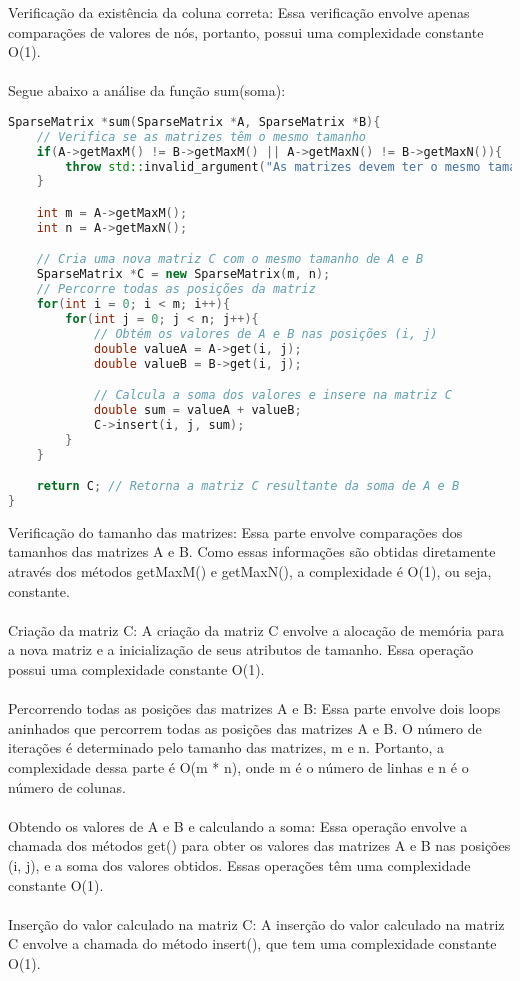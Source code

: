 \documentclass[a4paper,12pt]{article}
\begin{document}
Verificação da existência da coluna correta: Essa verificação envolve apenas comparações de valores de nós, portanto, possui uma complexidade constante O(1).
\\\\
Segue abaixo a análise da função sum(soma):
\begin{lstlisting}[language=C++]
SparseMatrix *sum(SparseMatrix *A, SparseMatrix *B){
    // Verifica se as matrizes têm o mesmo tamanho
    if(A->getMaxM() != B->getMaxM() || A->getMaxN() != B->getMaxN()){
        throw std::invalid_argument("As matrizes devem ter o mesmo tamanho para serem somadas.");
    }

    int m = A->getMaxM();
    int n = A->getMaxN();

    // Cria uma nova matriz C com o mesmo tamanho de A e B
    SparseMatrix *C = new SparseMatrix(m, n);
    // Percorre todas as posições da matriz
    for(int i = 0; i < m; i++){
        for(int j = 0; j < n; j++){
            // Obtém os valores de A e B nas posições (i, j)
            double valueA = A->get(i, j);
            double valueB = B->get(i, j);

            // Calcula a soma dos valores e insere na matriz C
            double sum = valueA + valueB;
            C->insert(i, j, sum);
        }
    }

    return C; // Retorna a matriz C resultante da soma de A e B
}
\end{lstlisting}
Verificação do tamanho das matrizes: Essa parte envolve comparações dos tamanhos das matrizes A e B. Como essas informações são obtidas diretamente através dos métodos getMaxM() e getMaxN(), a complexidade é O(1), ou seja, constante.
\\\\
Criação da matriz C: A criação da matriz C envolve a alocação de memória para a nova matriz e a inicialização de seus atributos de tamanho. Essa operação possui uma complexidade constante O(1).
\\\\
Percorrendo todas as posições das matrizes A e B: Essa parte envolve dois loops aninhados que percorrem todas as posições das matrizes A e B. O número de iterações é determinado pelo tamanho das matrizes, m e n. Portanto, a complexidade dessa parte é O(m * n), onde m é o número de linhas e n é o número de colunas.
\\\\
Obtendo os valores de A e B e calculando a soma: Essa operação envolve a chamada dos métodos get() para obter os valores das matrizes A e B nas posições (i, j), e a soma dos valores obtidos. Essas operações têm uma complexidade constante O(1).
\\\\
Inserção do valor calculado na matriz C: A inserção do valor calculado na matriz C envolve a chamada do método insert(), que tem uma complexidade constante O(1).
\end{document}
